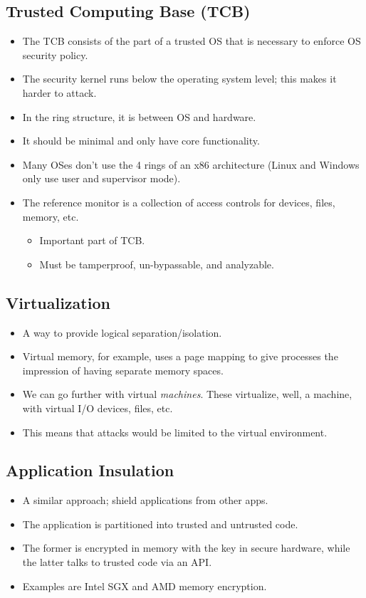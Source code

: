 \documentclass{article}
\begin{document}
\subsection{Trusted Computing Base (TCB)}
\begin{itemize}
    \item The TCB consists of the part of a trusted OS that is necessary to enforce OS security policy.
    \item The security kernel runs below the operating system level; this makes it harder to attack.
    \item In the ring structure, it is between OS and hardware.
    \item It should be minimal and only have core functionality.
    \item Many OSes don't use the 4 rings of an x86 architecture (Linux and Windows only use user and supervisor mode).
    \item The reference monitor is a collection of access controls for devices, files, memory, etc.
        \begin{itemize}
            \item Important part of TCB.
            \item Must be tamperproof, un-bypassable, and analyzable.
        \end{itemize}
\end{itemize}

\subsection{Virtualization}
\begin{itemize}
    \item A way to provide logical separation/isolation.
    \item Virtual memory, for example, uses a page mapping to give processes the impression of having separate memory spaces.
    \item We can go further with virtual \emph{machines}.  These virtualize, well, a machine, with virtual I/O devices, files, etc.
    \item This means that attacks would be limited to the virtual environment.
\end{itemize}

\subsection{Application Insulation}
\begin{itemize}
    \item A similar approach; shield applications from other apps.
    \item The application is partitioned into trusted and untrusted code.
    \item The former is encrypted in memory with the key in secure hardware, while the latter talks to trusted code via an API.
    \item Examples are Intel SGX and AMD memory encryption.
\end{itemize}
\end{document}

